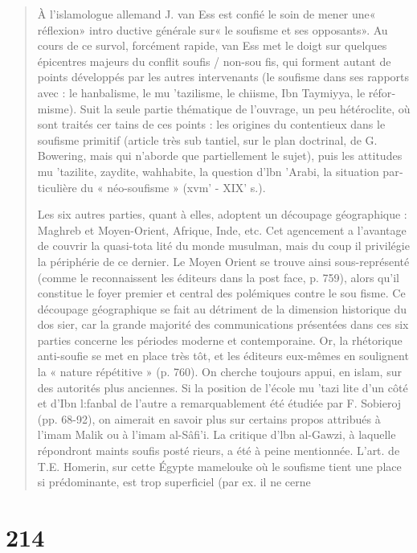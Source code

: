 \begin{quote}
À l'islamologue allemand J. van Ess est confié le soin de mener une«
réflexion» intro­ ductive générale sur« le soufisme et ses opposants».
Au cours de ce survol, forcément rapide, van Ess met le doigt sur
quelques épicentres majeurs du conflit soufis / non-sou­ fis, qui
forment autant de points développés par les autres intervenants (le
soufisme dans ses rapports avec : le hanbalisme, le mu 'tazilisme, le
chiisme, Ibn Taymiyya, le réfor­ misme). Suit la seule partie thématique
de l'ouvrage, un peu hétéroclite, où sont traités cer­ tains de ces
points : les origines du contentieux dans le soufisme primitif (article
très sub­ tantiel, sur le plan doctrinal, de G. Bowering, mais qui
n'aborde que partiellement le sujet), puis les attitudes mu 'tazilite,
zaydite, wahhabite, la question d'lbn 'Arabi, la situation par­
ticulière du « néo-soufisme » (xvm' - XIX' s.).

Les six autres parties, quant à elles, adoptent un découpage
géographique : Maghreb et Moyen-Orient, Afrique, Inde, etc. Cet
agencement a l'avantage de couvrir la quasi-tota­ lité du monde
musulman, mais du coup il privilégie la périphérie de ce dernier. Le
Moyen Orient se trouve ainsi sous-représenté (comme le reconnaissent les
éditeurs dans la post­ face, p. 759), alors qu'il constitue le foyer
premier et central des polémiques contre le sou­ fisme. Ce découpage
géographique se fait au détriment de la dimension historique du dos­
sier, car la grande majorité des communications présentées dans ces six
parties concerne les périodes moderne et contemporaine. Or, la
rhétorique anti-soufie se met en place très tôt, et les éditeurs
eux-mêmes en soulignent la « nature répétitive » (p. 760). On cherche
toujours appui, en islam, sur des autorités plus anciennes. Si la
position de l'école mu 'tazi­ lite d'un côté et d'Ibn l:fanbal de
l'autre a remarquablement été étudiée par F. Sobieroj (pp. 68-92), on
aimerait en savoir plus sur certains propos attribués à l'imam Malik ou
à l'imam al-Sâfi'i. La critique d'lbn al-Gawzi, à laquelle répondront
maints soufis posté­ rieurs, a été à peine mentionnée. L'art. de T.E.
Homerin, sur cette Égypte mamelouke où le soufisme tient une place si
prédominante, est trop superficiel (par ex. il ne cerne
\end{quote}

\hypertarget{section}{%
\section{214}\label{section}}

